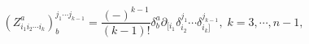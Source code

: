 \begin{equation}
\left( Z_{i_{1}i_{2}\cdots i_{k}}^{a}\right) _{b}^{j_{1}\cdots j_{k-1}}=%
\frac{\left( -\right) ^{k-1}}{\left( k-1\right) !}\delta _{b}^{a}\partial
_{[i_{1}}\delta _{i_{2}}^{j_{1}}\cdots \delta
_{i_{k}]}^{j_{k-1}},\;k=3,\cdots ,n-1,  \label{f15}
\end{equation}

